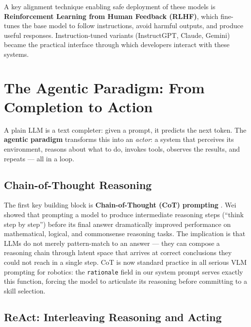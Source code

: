 A key alignment technique enabling safe deployment of these models is
\textbf{Reinforcement Learning from Human Feedback (RLHF)}, which fine-tunes the base
model to follow instructions, avoid harmful outputs, and produce useful responses.
Instruction-tuned variants (InstructGPT, Claude, Gemini) became the practical interface
through which developers interact with these systems.

\section{The Agentic Paradigm: From Completion to Action}
\label{sec:agents}

A plain LLM is a text completer: given a prompt, it predicts the next token.
The \textbf{agentic paradigm} transforms this into an \emph{actor}: a system that
perceives its environment, reasons about what to do, invokes tools, observes the results,
and repeats --- all in a loop.

\subsection{Chain-of-Thought Reasoning}

The first key building block is \textbf{Chain-of-Thought (CoT) prompting}
\cite{wei2022cot}.
Wei \etal showed that prompting a model to produce intermediate reasoning steps
(``think step by step'') before its final answer dramatically improved performance on
mathematical, logical, and commonsense reasoning tasks.
The implication is that LLMs do not merely pattern-match to an answer --- they can
compose a reasoning chain through latent space that arrives at correct conclusions they
could not reach in a single step.
CoT is now standard practice in all serious VLM prompting for robotics: the
\texttt{rationale} field in our system prompt serves exactly this function, forcing
the model to articulate its reasoning before committing to a skill selection.

\subsection{ReAct: Interleaving Reasoning and Acting}

